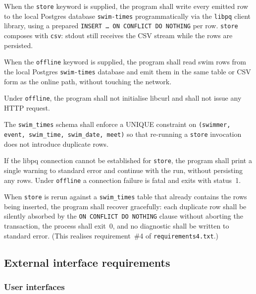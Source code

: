 \documentclass[12pt]{article}
\newcommand{\code}[1]{\texttt{#1}}
\newcommand{\req}[1]{\textbf{[#1]}}
\begin{document}
\begin{description}[style=nextline]
  \item[\req{REQ-F-70}] When the \code{store} keyword is supplied,
        the program shall write every emitted row to the local
        Postgres database \texttt{swim-times} programmatically via
        the \texttt{libpq} client library, using a prepared
        \texttt{INSERT \dots\ ON~CONFLICT~DO~NOTHING} per row.
        \code{store} composes with \code{csv}: stdout still
        receives the CSV stream while the rows are persisted.
  \item[\req{REQ-F-71}] When the \code{offline} keyword is
        supplied, the program shall read swim rows from the local
        Postgres \texttt{swim-times} database and emit them in the
        same table or CSV form as the online path, without
        touching the network.
  \item[\req{REQ-F-72}] Under \code{offline}, the program shall
        not initialise libcurl and shall not issue any HTTP
        request.
  \item[\req{REQ-F-73}] The \texttt{swim\_times} schema shall
        enforce a UNIQUE constraint on
        \code{(swimmer, event, swim\_time, swim\_date, meet)} so
        that re-running a \code{store} invocation does not
        introduce duplicate rows.
  \item[\req{REQ-F-74}] If the libpq connection cannot be
        established for \code{store}, the program shall print a
        single warning to standard error and continue with the
        run, without persisting any rows.  Under \code{offline} a
        connection failure is fatal and exits with status~1.
  \item[\req{REQ-F-75}] When \code{store} is rerun against a
        \texttt{swim\_times} table that already contains the rows
        being inserted, the program shall recover gracefully: each
        duplicate row shall be silently absorbed by the
        \texttt{ON~CONFLICT~DO~NOTHING} clause without aborting
        the transaction, the process shall exit~0, and no
        diagnostic shall be written to standard error.
        (This realises requirement~\#4 of \texttt{requirements4.txt}.)
\end{description}

\subsection{External interface requirements}

\subsubsection{User interfaces}
\end{document}
